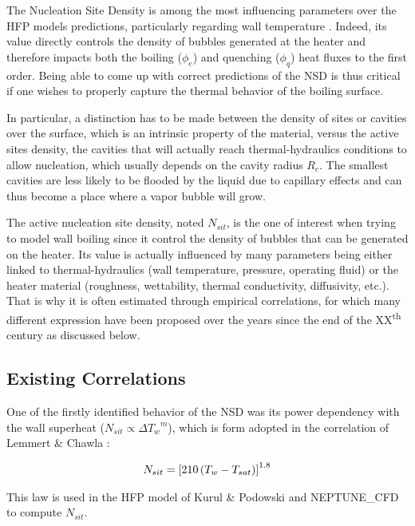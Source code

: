 The Nucleation Site Density is among the most influencing parameters over the HFP models predictions, particularly regarding wall temperature \cite{favre_neptune_2022}. Indeed, its value directly controls the density of bubbles generated at the heater and therefore impacts both the boiling ($\phi_{e}$) and quenching ($\phi_{q}$) heat fluxes to the first order. Being able to come up with correct predictions of the NSD is thus critical if one wishes to properly capture the thermal behavior of the boiling surface.

\npar

In particular, a distinction has to be made between the density of sites or cavities over the surface, which is an intrinsic property of the material, versus the active sites density, \ie the cavities that will actually reach thermal-hydraulics conditions to allow nucleation, which usually depends on the cavity radius $R_{c}$. The smallest cavities are less likely to be flooded by the liquid due to capillary effects and can thus become a place where a vapor bubble will grow. 

\npar
The active nucleation site density, noted $N_{sit}$, is the one of interest when trying to model wall boiling since it control the density of bubbles that can be generated on the heater. Its value is actually influenced by many parameters being either linked to thermal-hydraulics (wall temperature, pressure, operating fluid) or the heater material (roughness, wettability, thermal conductivity, diffusivity, etc.). That is why it is often estimated through empirical correlations, for which many different expression have been proposed over the years since the end of the XX\textsuperscript{th} century as discussed below.




\subsection{Existing Correlations}

One of the firstly identified behavior of the NSD was its power dependency with the wall superheat ($N_{sit} \propto {\Delta T_{w}}^{m}$), which is form adopted in the correlation of Lemmert \& Chawla \cite{lemmert_influence_1977} : 

\begin{align}
N_{sit}=\left[ 210\left( T_{w}-T_{sat} \right) \right]^{1.8}
\label{eq:nsit_lemmert}
\end{align}

\begin{note*}{}
This law is used in the HFP model of Kurul \& Podowski and NEPTUNE\_CFD to compute $N_{sit}$.
\end{note*}

